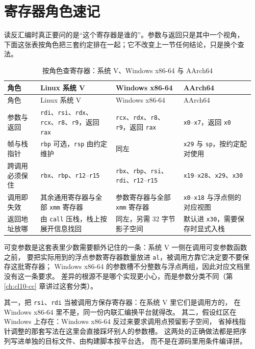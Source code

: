 \documentclass[12pt,a4paper,fontset=fandol]{ctexbook}
\newcommand{\Tp}[1]{\texttt{#1}}
\newcommand{\Nix}{\textsf{Linux}}
\newcommand{\Win}{\textsf{Windows}}
\newcommand{\xSixtyFour}{\textsf{x86-64}}
\newcommand{\ArmSixtyFour}{\textsf{AArch64}}
\begin{document}
\section{寄存器角色速记}

读反汇编时真正要问的是“这个寄存器是谁的”。参数与返回只是其中一个视角，
下面这张表按角色把三套约定排在一起；它不改变上一节任何结论，只是换个查法。

\begin{longtable}{@{}>{\raggedright\arraybackslash}p{} >{\raggedright\arraybackslash}p{} >{\raggedright\arraybackslash}p{} >{\raggedright\arraybackslash}p{}@{}}
\caption{按角色查寄存器：系统 V、\Win{} \xSixtyFour{} 与 \ArmSixtyFour}\label{tab:apB-roles}\\
\toprule
角色 & \Nix{} 系统 V & \Win{} \xSixtyFour & \ArmSixtyFour \\
\midrule
\endfirsthead
\toprule
角色 & \Nix{} 系统 V & \Win{} \xSixtyFour & \ArmSixtyFour \\
\midrule
\endhead
\bottomrule
\endfoot
参数与返回 & \Tp{rdi}、\Tp{rsi}、\Tp{rdx}、\Tp{rcx}、\Tp{r8}、\Tp{r9}，返回 \Tp{rax} &
\Tp{rcx}、\Tp{rdx}、\Tp{r8}、\Tp{r9}，返回 \Tp{rax} &
\Tp{x0}--\Tp{x7}，返回 \Tp{x0} \\
帧与栈指针 & \Tp{rbp} 可选，\Tp{rsp} 由约定维护 & 同左 & \Tp{x29} 与 \Tp{sp}，按约定配对使用 \\
跨调用必须保住 & \Tp{rbx}、\Tp{rbp}、\Tp{r12}--\Tp{r15} &
\Tp{rbx}、\Tp{rbp}、\Tp{rsi}、\Tp{rdi}、\Tp{r12}--\Tp{r15} &
\Tp{x19}--\Tp{x28}、\Tp{x29}、\Tp{x30} \\
调用即失效 & 其余通用寄存器与全部 \Tp{xmm} 寄存器 &
参数寄存器与全部 \Tp{xmm} 寄存器 &
\Tp{x0}--\Tp{x18} 与浮点侧的对应视图 \\
返回地址放哪 & 由 \Tp{call}{} 压栈，栈上按展开信息找回 & 同左，另需 32 字节影子空间 &
默认进 \Tp{x30}，需要保存时显式入栈 \\
\end{longtable}

可变参数是这套表里少数需要额外记住的一条：系统 V 一侧在调用可变参数函数之前，
要把实际用到的浮点参数寄存器数量放进 \Tp{al}，被调用方靠它决定要不要保存这批寄存器；
\Win{} \xSixtyFour{} 的参数槽不分整数与浮点两组，因此对应文档里没有这一条要求。
差异的根源不是哪个实现更小心，而是参数分类不同（第 \ref{ch:cl10-cc} 章讲过这套分类）。

\begin{warning}[title=手写序列时最容易踩的两处]
其一，把 \Tp{rsi}、\Tp{rdi} 当被调用方保存寄存器：在系统 V 里它们是调用方的，
在 \Win{} \xSixtyFour{} 里不是，同一份内联汇编换平台就得改。
其二，假设红区在 \Win{} 上存在：\Win{} \xSixtyFour{} 反过来要求调用点预留影子空间，
省掉栈指针调整的那套写法在这里会直接踩坏别人的参数槽。
这两处的正确做法都是把序列写进单独的目标文件、由构建脚本按平台选，
而不是在源码里用条件编译拼。
\end{warning}
\end{document}
